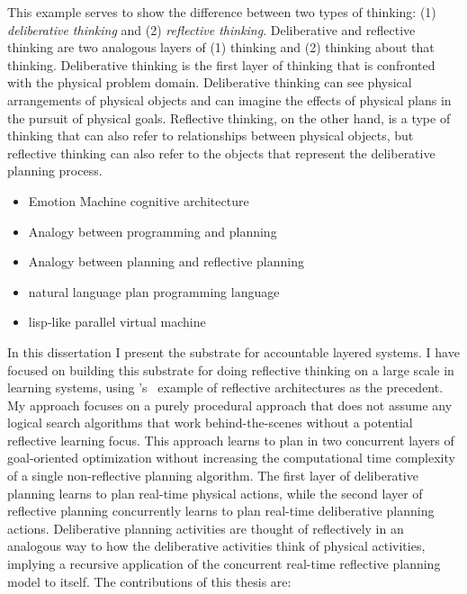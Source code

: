 This example serves to show the difference between two types of
thinking: (1) {\emph{deliberative thinking}} and (2) {\emph{reflective
    thinking}}.  Deliberative and reflective thinking are two
analogous layers of (1) thinking and (2) thinking about that thinking.
Deliberative thinking is the first layer of thinking that is
confronted with the physical problem domain.  Deliberative thinking
can see physical arrangements of physical objects and can imagine the
effects of physical plans in the pursuit of physical goals.
Reflective thinking, on the other hand, is a type of thinking that can
also refer to relationships between physical objects, but reflective
thinking can also refer to the objects that represent the deliberative
planning process.

\begin{itemize}
\item{Emotion Machine cognitive architecture}
\item{Analogy between programming and planning}
\item{Analogy between planning and reflective planning}
\item{natural language plan programming language}
\item{lisp-like parallel virtual machine}
\end{itemize}

In this dissertation I present the substrate for accountable layered
systems.  I have focused on building this substrate for doing
reflective thinking on a large scale in learning systems, using
{\mbox{\citeauthor{singh:2005b}'s~\citeyearpar{singh:2005b}}} example
of reflective architectures as the precedent.  My approach focuses on
a purely procedural approach that does not assume any logical search
algorithms that work behind-the-scenes without a potential reflective
learning focus.  This approach learns to plan in two concurrent layers
of goal-oriented optimization without increasing the computational
time complexity of a single non-reflective planning algorithm.  The
first layer of deliberative planning learns to plan real-time physical
actions, while the second layer of reflective planning concurrently
learns to plan real-time deliberative planning actions.  Deliberative
planning activities are thought of reflectively in an analogous way to
how the deliberative activities think of physical activities, implying
a recursive application of the concurrent real-time reflective
planning model to itself.  The contributions of this thesis are:

